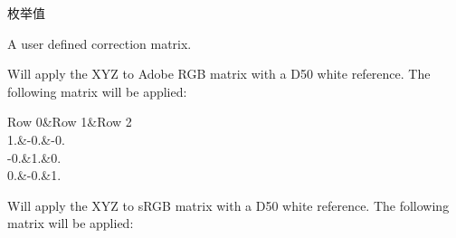 \begin{Desc}
\item[枚举值]\par
\begin{description}
\item[{\em 
\hypertarget{group___common_interface_gga0892ed0e7e5949707e49bb7d584f8478aff328ac49272146c46afe22eda5af233}{ctocmm\+User}\label{group___common_interface_gga0892ed0e7e5949707e49bb7d584f8478aff328ac49272146c46afe22eda5af233}
}]A user defined correction matrix. \item[{\em 
\hypertarget{group___common_interface_gga0892ed0e7e5949707e49bb7d584f8478a1dc4d7bd21fe0ff9dadc06e4f58b5f04}{ctocmm\+X\+Y\+Z\+To\+Adobe\+R\+G\+B\+\_\+\+D50}\label{group___common_interface_gga0892ed0e7e5949707e49bb7d584f8478a1dc4d7bd21fe0ff9dadc06e4f58b5f04}
}]Will apply the X\+Y\+Z to Adobe R\+G\+B matrix with a D50 white reference. The following matrix will be applied\+:

\begin{TabularC}{3}
\hline
Row 0&Row 1&Row 2 \\
1.&-\/0.&-\/0. \\
-\/0.&1.&0. \\
0.&-\/0.&1. \\
\end{TabularC}
\item[{\em 
\hypertarget{group___common_interface_gga0892ed0e7e5949707e49bb7d584f8478a6f0faa342b42f2e3ee9edf91a0cb1cbf}{ctocmm\+X\+Y\+Z\+Tos\+R\+G\+B\+\_\+\+D50}\label{group___common_interface_gga0892ed0e7e5949707e49bb7d584f8478a6f0faa342b42f2e3ee9edf91a0cb1cbf}
}]Will apply the X\+Y\+Z to s\+R\+G\+B matrix with a D50 white reference. The following matrix will be applied\+:


\end{description}
\end{Desc}
